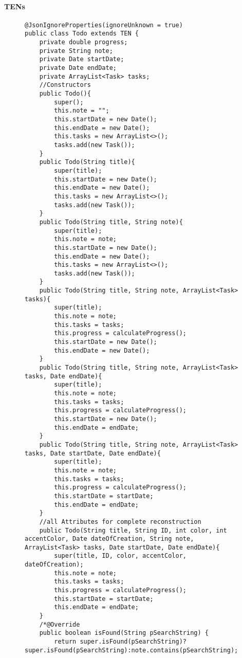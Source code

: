 		\paragraph{TENs}	
\begin{figure}[H]
\begin{lstlisting}[caption=Todo (Joscha Nassenstein)]
@JsonIgnoreProperties(ignoreUnknown = true)
public class Todo extends TEN {
    private double progress;
    private String note;
    private Date startDate;
    private Date endDate;
    private ArrayList<Task> tasks;
    //Constructors
    public Todo(){
        super();
        this.note = "";
        this.startDate = new Date();
        this.endDate = new Date();
        this.tasks = new ArrayList<>();
        tasks.add(new Task());
    }
    public Todo(String title){
        super(title);
        this.startDate = new Date();
        this.endDate = new Date();
        this.tasks = new ArrayList<>();
        tasks.add(new Task());
    }
    public Todo(String title, String note){
        super(title);
        this.note = note;
        this.startDate = new Date();
        this.endDate = new Date();
        this.tasks = new ArrayList<>();
        tasks.add(new Task());
    }
    public Todo(String title, String note, ArrayList<Task> tasks){
        super(title);
        this.note = note;
        this.tasks = tasks;
        this.progress = calculateProgress();
        this.startDate = new Date();
        this.endDate = new Date();
    }
    public Todo(String title, String note, ArrayList<Task> tasks, Date endDate){
        super(title);
        this.note = note;
        this.tasks = tasks;
        this.progress = calculateProgress();
        this.startDate = new Date();
        this.endDate = endDate;
    }
    public Todo(String title, String note, ArrayList<Task> tasks, Date startDate, Date endDate){
        super(title);
        this.note = note;
        this.tasks = tasks;
        this.progress = calculateProgress();
        this.startDate = startDate;
        this.endDate = endDate;
    }
    //all Attributes for complete reconstruction
    public Todo(String title, String ID, int color, int accentColor, Date dateOfCreation, String note, ArrayList<Task> tasks, Date startDate, Date endDate){
        super(title, ID, color, accentColor, dateOfCreation);
        this.note = note;
        this.tasks = tasks;
        this.progress = calculateProgress();
        this.startDate = startDate;
        this.endDate = endDate;
    }
    /*@Override
    public boolean isFound(String pSearchString) {
        return super.isFound(pSearchString)?super.isFound(pSearchString):note.contains(pSearchString);

\end{lstlisting}
\end{figure}
